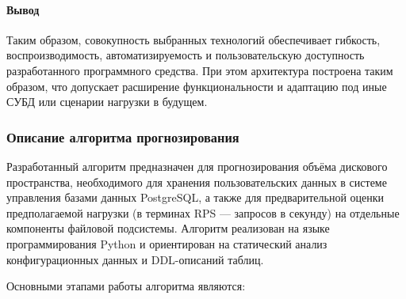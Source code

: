 \paragraph{Вывод}

Таким образом, совокупность выбранных технологий обеспечивает гибкость, воспроизводимость, автоматизируемость и пользовательскую доступность разработанного программного средства. При этом архитектура построена таким образом, что допускает расширение функциональности и адаптацию под иные СУБД или сценарии нагрузки в будущем.




\subsubsection{Описание алгоритма прогнозирования}

Разработанный алгоритм предназначен для прогнозирования объёма дискового пространства, необходимого для хранения пользовательских данных в системе управления базами данных PostgreSQL, а также для предварительной оценки предполагаемой нагрузки (в терминах RPS --- запросов в секунду) на отдельные компоненты файловой подсистемы. Алгоритм реализован на языке программирования Python и ориентирован на статический анализ конфигурационных данных и DDL-описаний таблиц.

\vspace{0.5em}
\noindent
Основными этапами работы алгоритма являются:

